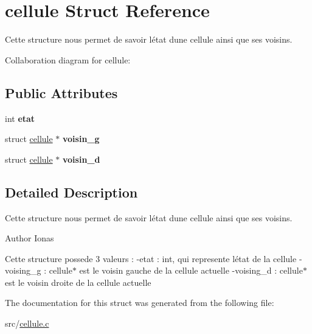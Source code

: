 \hypertarget{structcellule}{}\section{cellule Struct Reference}
\label{structcellule}


Cette structure nous permet de savoir l\textquotesingle{}état d\textquotesingle{}une cellule ainsi que ses voisins.  




Collaboration diagram for cellule\+:
\subsection*{Public Attributes}
\begin{DoxyCompactItemize}
\item 
\mbox{\label{structcellule_adc509a62be6972be191c96e5051327f9}} 
int {\bfseries etat}
\item 
\mbox{\label{structcellule_a5d23eb449994e91d1f5f962726454d93}} 
struct \hyperlink{structcellule}{cellule} $\ast$ {\bfseries voisin\+\_\+g}
\item 
\mbox{\label{structcellule_a285832f075c83fb2e707b3496104f6d4}} 
struct \hyperlink{structcellule}{cellule} $\ast$ {\bfseries voisin\+\_\+d}
\end{DoxyCompactItemize}


\subsection{Detailed Description}
Cette structure nous permet de savoir l\textquotesingle{}état d\textquotesingle{}une cellule ainsi que ses voisins. 

\begin{DoxyAuthor}{Author}
Ionas
\end{DoxyAuthor}
Cette structure possede 3 valeurs \+: -\/etat \+: int, qui represente l\textquotesingle{}état de la cellule -\/voising\+\_\+g \+: cellule$\ast$ est le voisin gauche de la cellule actuelle -\/voising\+\_\+d \+: cellule$\ast$ est le voisin droite de la cellule actuelle 

The documentation for this struct was generated from the following file\+:\begin{DoxyCompactItemize}
\item 
src/\hyperlink{cellule_8c}{cellule.\+c}\end{DoxyCompactItemize}
